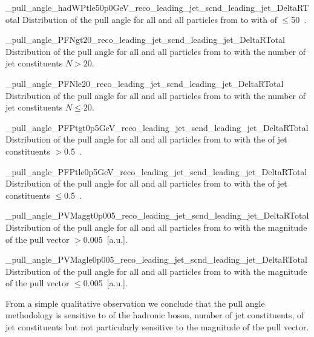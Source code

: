     {_pull_angle_hadWPtle50p0GeV_reco_leading_jet_scnd_leading_jet_DeltaRTotal}
     {Distribution of the pull angle for all \DeltaR and all particles from \leadingjet to \scndleadingjet with \pt of \PW $\leq$50~\GeV.}

     {_pull_angle_PFNgt20_reco_leading_jet_scnd_leading_jet_DeltaRTotal}
     {Distribution of the pull angle for all \DeltaR and all particles from \leadingjet to \scndleadingjet with the number of jet constituents $N>20$.}

     {_pull_angle_PFNle20_reco_leading_jet_scnd_leading_jet_DeltaRTotal}
     {Distribution of the pull angle for all \DeltaR and all particles from \leadingjet to \scndleadingjet with the number of jet constituents $N\leq20$.}

     {_pull_angle_PFPtgt0p5GeV_reco_leading_jet_scnd_leading_jet_DeltaRTotal}
     {Distribution of the pull angle for all \DeltaR and all particles from \leadingjet to \scndleadingjet with the \pt of jet constituents $>$0.5~\GeV.}

     {_pull_angle_PFPtle0p5GeV_reco_leading_jet_scnd_leading_jet_DeltaRTotal}
     {Distribution of the pull angle for all \DeltaR and all particles from \leadingjet to \scndleadingjet with the \pt of jet constituents $\leq$0.5~\GeV.}

     {_pull_angle_PVMaggt0p005_reco_leading_jet_scnd_leading_jet_DeltaRTotal}
     {Distribution of the pull angle for all \DeltaR and all particles from \leadingjet to \scndleadingjet with the magnitude of the pull vector $>$0.005~[a.u.].}

    {_pull_angle_PVMagle0p005_reco_leading_jet_scnd_leading_jet_DeltaRTotal}
    {Distribution of the pull angle for all \DeltaR and all particles from \leadingjet to \scndleadingjet with the magnitude of the pull vector $\leq $0.005~[a.u.].}

From a simple qualitative observation we conclude that the pull angle methodology is sensitive to \pt of the hadronic \PW boson, number of jet constituents, \pt of jet constituents but not particularly sensitive to the magnitude of the pull vector.



